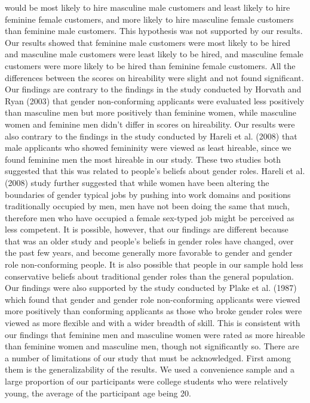 \documentclass[english,man]{apa6}
\theoremstyle{definition}
\theoremstyle{definition}
\theoremstyle{remark}
\begin{document}
would be most likely to hire masculine male customers and least likely
to hire feminine female customers, and more likely to hire masculine
female customers than feminine male customers. This hypothesis was not
supported by our results. Our results showed that feminine male
customers were most likely to be hired and masculine male customers were
least likely to be hired, and masculine female customers were more
likely to be hired than feminine female customers. All the differences
between the scores on hireability were slight and not found significant.
Our findings are contrary to the findings in the study conducted by
Horvath and Ryan (2003) that gender non-conforming applicants were
evaluated less positively than masculine men but more positively than
feminine women, while masculine women and feminine men didn't differ in
scores on hireability. Our results were also contrary to the findings in
the study conducted by Hareli et al. (2008) that male applicants who
showed femininity were viewed as least hireable, since we found feminine
men the most hireable in our study. These two studies both suggested
that this was related to people's beliefs about gender roles. Hareli et
al. (2008) study further suggested that while women have been altering
the boundaries of gender typical jobs by pushing into work domains and
positions traditionally occupied by men, men have not been doing the
same that much, therefore men who have occupied a female sex-typed job
might be perceived as less competent. It is possible, however, that our
findings are different because that was an older study and people's
beliefs in gender roles have changed, over the past few years, and
become generally more favorable to gender and gender role non-conforming
people. It is also possible that people in our sample hold less
conservative beliefs about traditional gender roles than the general
population. Our findings were also supported by the study conducted by
Plake et al. (1987) which found that gender and gender role
non-conforming applicants were viewed more positively than conforming
applicants as those who broke gender roles were viewed as more flexible
and with a wider breadth of skill. This is consistent with our findings
that feminine men and masculine women were rated as more hireable than
feminine women and masculine men, though not significantly so. There are
a number of limitations of our study that must be acknowledged. First
among them is the generalizability of the results. We used a convenience
sample and a large proportion of our participants were college students
who were relatively young, the average of the participant age being 20.
\end{document}

